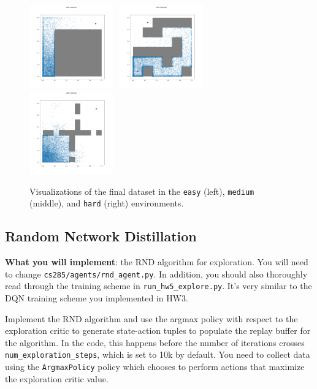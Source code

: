 \documentclass{article}
\begin{document}
\begin{figure}[H]
    \centering
    \includegraphics[width=0.32\textwidth]{../report/assets/PointmassEasy-v0_random.png}~
    \includegraphics[width=0.32\textwidth]{../report/assets/PointmassMedium-v0_random.png}~
    \includegraphics[width=0.32\textwidth]{../report/assets/PointmassHard-v0_random.png}
    \caption{Visualizations of the final dataset in the \texttt{easy} (left), \texttt{medium} (middle), and \texttt{hard} (right) environments.}
\end{figure}

\subsection{Random Network Distillation}
\textbf{What you will implement}: the RND algorithm for exploration. You will need to change \verb+cs285/agents/rnd_agent.py+. In addition, you should also thoroughly read through the training scheme in \verb+run_hw5_explore.py+. It's very similar to the DQN training scheme you implemented in HW3.

Implement the RND algorithm and use the argmax policy with respect to the exploration critic to generate state-action tuples to populate the replay buffer for the algorithm. In the code, this happens before the number of iterations crosses \verb+num_exploration_steps+, which is set to 10k by default. You need to collect data using the \verb+ArgmaxPolicy+ policy which chooses to perform actions that maximize the exploration critic value.
\end{document}
